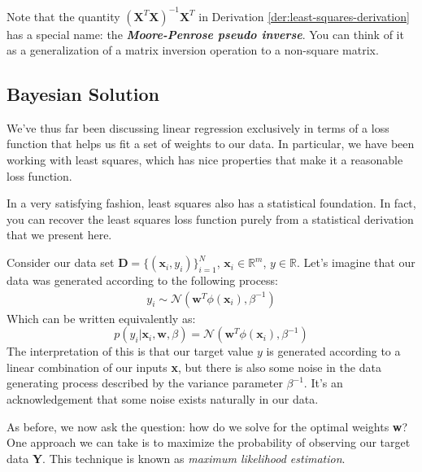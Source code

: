 Note that the quantity $(\textbf{X}^{T}\textbf{X})^{-1}\textbf{X}^{T}$ in Derivation \ref{der:least-squares-derivation} has a special name: the \textbf{\textit{Moore-Penrose pseudo inverse}}. You can think of it as a generalization of a matrix inversion operation to a non-square matrix.

\subsection{Bayesian Solution}
We've thus far been discussing linear regression exclusively in terms of a loss function that helps us fit a set of weights to our data. In particular, we have been working with least squares, which has nice properties that make it a reasonable loss function.

In a very satisfying fashion, least squares also has a statistical foundation. In fact, you can recover the least squares loss function purely from a statistical derivation that we present here.

Consider our data set $\textbf{D} = \{(\textbf{x}_{i}, y_{i})\}_{i = 1}^{N}$, $\textbf{x}_{i} \in\mathbb{R}^m$, $y \in\mathbb{R}$. Let's imagine that our data was generated according to the following process:
\begin{align*}
    y_{i} \sim \mathcal{N}(\textbf{w}^{T}\phi(\textbf{x}_{i}), \beta^{-1})
\end{align*}
Which can be written equivalently as:
\begin{equation} \label{normal-over-w}
    p(y_{i} | \textbf{x}_{i}, \textbf{w}, \beta) = \mathcal{N}(\textbf{w}^{T}\phi(\textbf{x}_{i}), \beta^{-1})
\end{equation}
The interpretation of this is that our target value $y$ is generated according to a linear combination of our inputs \textbf{x}, but there is also some noise in the data generating process described by the variance parameter $\beta^{-1}$. It's an acknowledgement that some noise exists naturally in our data.


As before, we now ask the question: how do we solve for the optimal weights \textbf{w}? One approach we can take is to maximize the probability of observing our target data \textbf{Y}. This technique is known as \textit{maximum likelihood estimation}.


